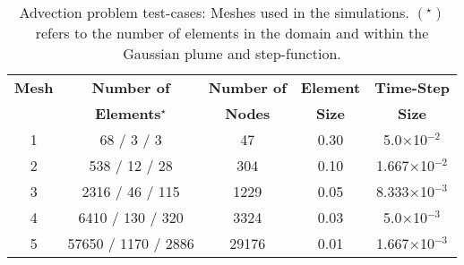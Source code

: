 

\begin{table}
\begin{center}
\begin{tabular}{||c|| c c c c ||}
\hline\hline
{\bf Mesh} & {\bf Number of}        & {\bf Number of} & {\bf Element}  & {\bf Time-Step}    \\
           & {\bf Elements}$^{\star}$&{\bf Nodes}      & {\bf Size}     & {\bf Size}  \\
\hline
1          & 68 / 3 / 3                & 47              & 0.30           & 5.0$\times$10$^{-2}$ \\
2          & 538 / 12  / 28             & 304             & 0.10           & 1.667$\times$10$^{-2}$ \\
3          & 2316 / 46  / 115            & 1229            & 0.05           & 8.333$\times$10$^{-3}$ \\
4          & 6410 / 130  / 320           & 3324            & 0.03           & 5.0$\times$10$^{-3}$ \\
5          & 57650 / 1170 / 2886          & 29176           & 0.01           & 1.667$\times$10$^{-3}$ \\
\hline\hline
\end{tabular}
\caption{Advection problem test-cases: Meshes used in the simulations. $\left(^{\star}\right)$ refers to the number of elements in the domain and within the Gaussian plume and step-function. \label{table:meshplume}}
\end{center}
\end{table}
\clearpage 

